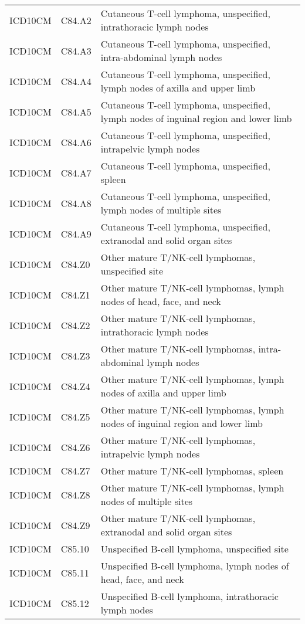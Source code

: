 \begin{longtable}{p{}p{}p{}}
  ICD10CM & C84.A2 & Cutaneous T-cell lymphoma, unspecified, intrathoracic lymph nodes \\ 
  ICD10CM & C84.A3 & Cutaneous T-cell lymphoma, unspecified, intra-abdominal lymph nodes \\ 
  ICD10CM & C84.A4 & Cutaneous T-cell lymphoma, unspecified, lymph nodes of axilla and upper limb \\ 
  ICD10CM & C84.A5 & Cutaneous T-cell lymphoma, unspecified, lymph nodes of inguinal region and lower limb \\ 
  ICD10CM & C84.A6 & Cutaneous T-cell lymphoma, unspecified, intrapelvic lymph nodes \\ 
  ICD10CM & C84.A7 & Cutaneous T-cell lymphoma, unspecified, spleen \\ 
  ICD10CM & C84.A8 & Cutaneous T-cell lymphoma, unspecified, lymph nodes of multiple sites \\ 
  ICD10CM & C84.A9 & Cutaneous T-cell lymphoma, unspecified, extranodal and solid organ sites \\ 
  ICD10CM & C84.Z0 & Other mature T/NK-cell lymphomas, unspecified site \\ 
  ICD10CM & C84.Z1 & Other mature T/NK-cell lymphomas, lymph nodes of head, face, and neck \\ 
  ICD10CM & C84.Z2 & Other mature T/NK-cell lymphomas, intrathoracic lymph nodes \\ 
  ICD10CM & C84.Z3 & Other mature T/NK-cell lymphomas, intra-abdominal lymph nodes \\ 
  ICD10CM & C84.Z4 & Other mature T/NK-cell lymphomas, lymph nodes of axilla and upper limb \\ 
  ICD10CM & C84.Z5 & Other mature T/NK-cell lymphomas, lymph nodes of inguinal region and lower limb \\ 
  ICD10CM & C84.Z6 & Other mature T/NK-cell lymphomas, intrapelvic lymph nodes \\ 
  ICD10CM & C84.Z7 & Other mature T/NK-cell lymphomas, spleen \\ 
  ICD10CM & C84.Z8 & Other mature T/NK-cell lymphomas, lymph nodes of multiple sites \\ 
  ICD10CM & C84.Z9 & Other mature T/NK-cell lymphomas, extranodal and solid organ sites \\ 
  ICD10CM & C85.10 & Unspecified B-cell lymphoma, unspecified site \\ 
  ICD10CM & C85.11 & Unspecified B-cell lymphoma, lymph nodes of head, face, and neck \\ 
  ICD10CM & C85.12 & Unspecified B-cell lymphoma, intrathoracic lymph nodes \\ 

\end{longtable}
